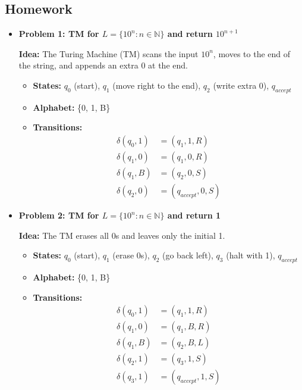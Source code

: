 \documentclass[11pt]{article}
\begin{document}
\subsection{Homework}

\begin{itemize}[leftmargin=*]

\item \textbf{Problem 1: TM for \( L = \{10^n : n \in \mathbb{N} \} \) and return \( 10^{n+1} \)}

\textbf{Idea:}  
The Turing Machine (TM) scans the input \(10^n\), moves to the end of the string, and appends an extra 0 at the end.

\begin{itemize}
    \item \textbf{States:} \( q_0 \) (start), \( q_1 \) (move right to the end), \( q_2 \) (write extra 0), \( q_{accept} \)
    \item \textbf{Alphabet:} \{0, 1, B\}
    \item \textbf{Transitions:}
    \[
    \begin{aligned}
    \delta(q_0, 1) &= (q_1, 1, R) \\
    \delta(q_1, 0) &= (q_1, 0, R) \\
    \delta(q_1, B) &= (q_2, 0, S) \\
    \delta(q_2, 0) &= (q_{accept}, 0, S)
    \end{aligned}
    \]
\end{itemize}

\vspace{1em}

\item \textbf{Problem 2: TM for \( L = \{10^n : n \in \mathbb{N} \} \) and return 1}

\textbf{Idea:}  
The TM erases all 0s and leaves only the initial 1.

\begin{itemize}
    \item \textbf{States:} \( q_0 \) (start), \( q_1 \) (erase 0s), \( q_2 \) (go back left), \( q_3 \) (halt with 1), \( q_{accept} \)
    \item \textbf{Alphabet:} \{0, 1, B\}
    \item \textbf{Transitions:}
    \[
    \begin{aligned}
    \delta(q_0, 1) &= (q_1, 1, R) \\
    \delta(q_1, 0) &= (q_1, B, R) \\
    \delta(q_1, B) &= (q_2, B, L) \\
    \delta(q_2, 1) &= (q_3, 1, S) \\
    \delta(q_3, 1) &= (q_{accept}, 1, S)
    \end{aligned}
    \]
\end{itemize}


\end{itemize}
\end{document}
